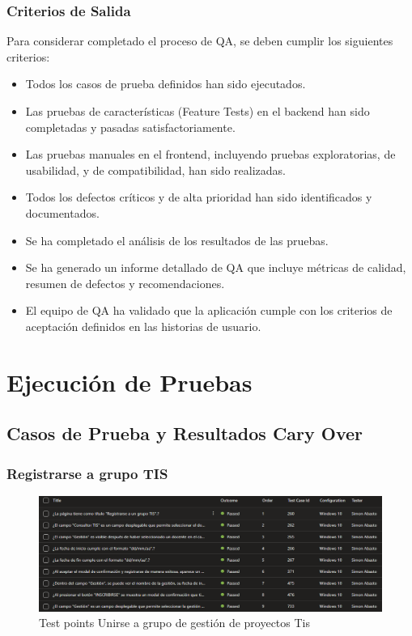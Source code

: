 \documentclass[12pt,letterpaper]{article}
\begin{document}
\subsubsection{Criterios de Salida}
    Para considerar completado el proceso de QA, se deben cumplir los siguientes criterios:
    \begin{itemize}
    \item Todos los casos de prueba definidos han sido ejecutados.
    \item Las pruebas de características (Feature Tests) en el backend han sido completadas y pasadas satisfactoriamente.
    \item Las pruebas manuales en el frontend, incluyendo pruebas exploratorias, de usabilidad, y de compatibilidad, han sido realizadas.
    \item Todos los defectos críticos y de alta prioridad han sido identificados y documentados.
    \item Se ha completado el análisis de los resultados de las pruebas.
    \item Se ha generado un informe detallado de QA que incluye métricas de calidad, resumen de defectos y recomendaciones.
    \item El equipo de QA ha validado que la aplicación cumple con los criterios de aceptación definidos en las historias de usuario.
    \end{itemize}
    








\section{Ejecución de Pruebas}

    \subsection{Casos de Prueba y Resultados Cary Over}
    
    \subsubsection{Registrarse a grupo TIS}
    \begin{figure}[H]
        \centering
        \includegraphics[width=1\linewidth]{case unirse a grupo de gestion proyectos tis.png}
        \caption{Test points Unirse a grupo de gestión de proyectos Tis}
    \end{figure}
\end{document}
